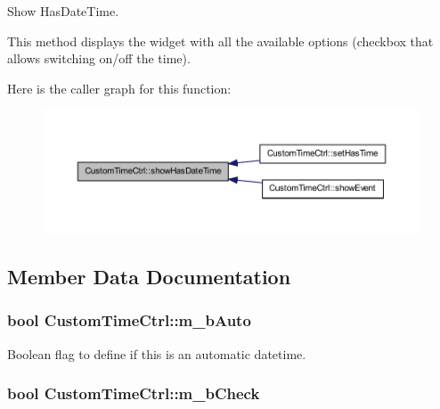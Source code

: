 Show HasDateTime. 

This method displays the widget with all the available options (checkbox that allows switching on/off the time). 

Here is the caller graph for this function:\nopagebreak
\begin{figure}[H]
\begin{center}
\leavevmode
\includegraphics[width=400pt]{class_custom_time_ctrl_a049b8611ab15ec4ad46a93e7306ecc95_icgraph}
\end{center}
\end{figure}




\subsection{Member Data Documentation}
\hypertarget{class_custom_time_ctrl_a10051394dabcc7222ce57980c23a1554}{
\subsubsection[{m\_\-bAuto}]{\setlength{\rightskip}{0pt plus 5cm}bool {\bf CustomTimeCtrl::m\_\-bAuto}}}
\label{class_custom_time_ctrl_a10051394dabcc7222ce57980c23a1554}


Boolean flag to define if this is an automatic datetime. 

\hypertarget{class_custom_time_ctrl_a24ca64a96066346b1d17414741143946}{
\subsubsection[{m\_\-bCheck}]{\setlength{\rightskip}{0pt plus 5cm}bool {\bf CustomTimeCtrl::m\_\-bCheck}}}
\label{class_custom_time_ctrl_a24ca64a96066346b1d17414741143946}


